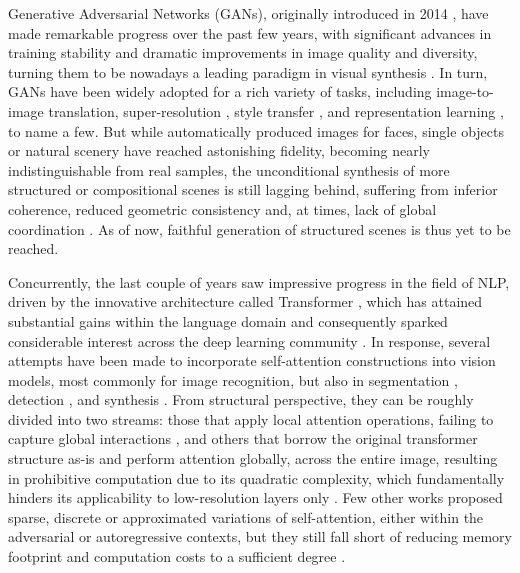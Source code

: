 \documentclass{article}
\begin{document}
Generative Adversarial Networks (GANs), originally introduced in 2014 \citep{gan}, have made remarkable progress over the past few years, with significant advances in training stability and dramatic improvements in image quality and diversity, turning them to be nowadays a leading paradigm in visual synthesis \citep{dcgan,biggan,stylegan}. In turn, GANs have been widely adopted for a rich variety of tasks, including image-to-image translation\citep{pix2pix,cyclegan}, super-resolution \citep{superres}, style transfer \citep{stargan}, and representation learning \citep{bigan}, to name a few. But while automatically produced images for faces, single objects or natural scenery have reached astonishing fidelity, becoming nearly indistinguishable from real samples, the unconditional synthesis of more structured or compositional scenes is still lagging behind, suffering from inferior coherence, reduced geometric consistency and, at times, lack of global coordination \citep{johnson,sbgan,iclrscenes,sagan}. As of now, faithful generation of structured scenes is thus yet to be reached. 

Concurrently, the last couple of years saw impressive progress in the field of NLP, driven by the innovative architecture called Transformer \citep{transformer}, which has attained substantial gains within the language domain and consequently sparked considerable interest across the deep learning community \citep{transformer,bert}. In response, several attempts have been made to incorporate self-attention constructions into vision models, most commonly for image recognition, but also in segmentation \citep{attsgm}, detection \citep{detr}, and synthesis \citep{sagan}. From structural perspective, they can be roughly divided into two streams: those that apply local attention operations, failing to capture global interactions \citep{localtrns1,localtrns2,localtrns3,localtrns4,imgtrns}, and others that borrow the original transformer structure as-is and perform attention globally, across the entire image, resulting in prohibitive computation due to its quadratic complexity, which fundamentally hinders its applicability to low-resolution layers only \citep{sagan,biggan,glbltrns1,glbltrns2,taming,vistrns,transgan}. Few other works proposed sparse, discrete or approximated variations of self-attention, either within the adversarial or autoregressive contexts, but they still fall short of reducing memory footprint and computation costs to a sufficient degree \citep{gsa,axial,criscros,taming,sparsetrns}. 
\end{document}
